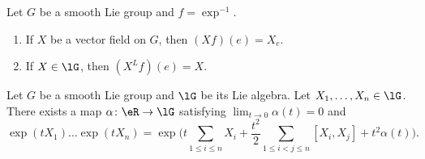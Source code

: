 \begin{lemma}	\label{LEMooVWBIooTxzPIN}
	Let \( G\) be a smooth Lie group and \( f=\exp^{-1}\).
	\begin{enumerate}
		\item
		      If \( X\) be a vector field on \( G\), then \( (Xf)(e)=X_e \).
		\item		\label{ITEMooZCKFooIKbIRx}
		      If \( X\in\lG\), then \( (X^Lf)(e)=X\).
	\end{enumerate}
\end{lemma}


\begin{proposition}	\label{PROPooPTYCooCuHEbO}
	Let \( G\) be a smooth Lie group and \( \lG \) be its Lie algebra. Let \( X_1,\ldots,X_n\in\lG\). There exists a map \(\alpha \colon \eR\to \lG  \) satisfying \( \lim_{t\to 0}\alpha(t)=0\) and
	\begin{equation}
		\exp(tX_1)\ldots \exp(tX_n)=\exp\Big(  t\sum_{1\leq i\leq n}X_i+\frac{ t^2 }{2}\sum_{1\leq i < j\leq n}[X_i,X_j]+t^2\alpha(t)   \Big).
	\end{equation}
\end{proposition}

